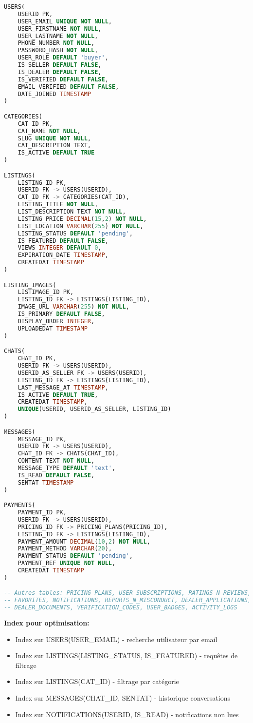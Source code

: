 \begin{lstlisting}[language=SQL, caption=Schéma relationnel (MLD)]
USERS(
    USERID PK,
    USER_EMAIL UNIQUE NOT NULL,
    USER_FIRSTNAME NOT NULL,
    USER_LASTNAME NOT NULL,
    PHONE_NUMBER NOT NULL,
    PASSWORD_HASH NOT NULL,
    USER_ROLE DEFAULT 'buyer',
    IS_SELLER DEFAULT FALSE,
    IS_DEALER DEFAULT FALSE,
    IS_VERIFIED DEFAULT FALSE,
    EMAIL_VERIFIED DEFAULT FALSE,
    DATE_JOINED TIMESTAMP
)

CATEGORIES(
    CAT_ID PK,
    CAT_NAME NOT NULL,
    SLUG UNIQUE NOT NULL,
    CAT_DESCRIPTION TEXT,
    IS_ACTIVE DEFAULT TRUE
)

LISTINGS(
    LISTING_ID PK,
    USERID FK -> USERS(USERID),
    CAT_ID FK -> CATEGORIES(CAT_ID),
    LISTING_TITLE NOT NULL,
    LIST_DESCRIPTION TEXT NOT NULL,
    LISTING_PRICE DECIMAL(15,2) NOT NULL,
    LIST_LOCATION VARCHAR(255) NOT NULL,
    LISTING_STATUS DEFAULT 'pending',
    IS_FEATURED DEFAULT FALSE,
    VIEWS INTEGER DEFAULT 0,
    EXPIRATION_DATE TIMESTAMP,
    CREATEDAT TIMESTAMP
)

LISTING_IMAGES(
    LISTIMAGE_ID PK,
    LISTING_ID FK -> LISTINGS(LISTING_ID),
    IMAGE_URL VARCHAR(255) NOT NULL,
    IS_PRIMARY DEFAULT FALSE,
    DISPLAY_ORDER INTEGER,
    UPLOADEDAT TIMESTAMP
)

CHATS(
    CHAT_ID PK,
    USERID FK -> USERS(USERID),
    USERID_AS_SELLER FK -> USERS(USERID),
    LISTING_ID FK -> LISTINGS(LISTING_ID),
    LAST_MESSAGE_AT TIMESTAMP,
    IS_ACTIVE DEFAULT TRUE,
    CREATEDAT TIMESTAMP,
    UNIQUE(USERID, USERID_AS_SELLER, LISTING_ID)
)

MESSAGES(
    MESSAGE_ID PK,
    USERID FK -> USERS(USERID),
    CHAT_ID FK -> CHATS(CHAT_ID),
    CONTENT TEXT NOT NULL,
    MESSAGE_TYPE DEFAULT 'text',
    IS_READ DEFAULT FALSE,
    SENTAT TIMESTAMP
)

PAYMENTS(
    PAYMENT_ID PK,
    USERID FK -> USERS(USERID),
    PRICING_ID FK -> PRICING_PLANS(PRICING_ID),
    LISTING_ID FK -> LISTINGS(LISTING_ID),
    PAYMENT_AMOUNT DECIMAL(10,2) NOT NULL,
    PAYMENT_METHOD VARCHAR(20),
    PAYMENT_STATUS DEFAULT 'pending',
    PAYMENT_REF UNIQUE NOT NULL,
    CREATEDAT TIMESTAMP
)

-- Autres tables: PRICING_PLANS, USER_SUBSCRIPTIONS, RATINGS_N_REVIEWS,
-- FAVORITES, NOTIFICATIONS, REPORTS_N_MISCONDUCT, DEALER_APPLICATIONS,
-- DEALER_DOCUMENTS, VERIFICATION_CODES, USER_BADGES, ACTIVITY_LOGS
\end{lstlisting}

\textbf{Index pour optimisation:}
\begin{itemize}
    \item Index sur USERS(USER\_EMAIL) - recherche utilisateur par email
    \item Index sur LISTINGS(LISTING\_STATUS, IS\_FEATURED) - requêtes de filtrage
    \item Index sur LISTINGS(CAT\_ID) - filtrage par catégorie
    \item Index sur MESSAGES(CHAT\_ID, SENTAT) - historique conversations
    \item Index sur NOTIFICATIONS(USERID, IS\_READ) - notifications non lues
\end{itemize}

